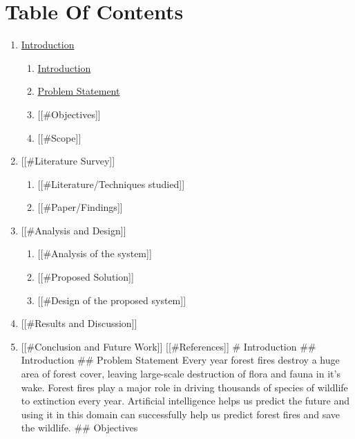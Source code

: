 \hypertarget{table-of-contents}{%
\section{Table Of Contents}\label{table-of-contents}}

\begin{enumerate}
\def\labelenumi{\arabic{enumi}.}
\tightlist
\item
  \protect\hyperlink{introduction}{Introduction}

  \begin{enumerate}
  \def\labelenumii{\arabic{enumii}.}
  \tightlist
  \item
    \protect\hyperlink{ux5cux23introduction}{Introduction}
  \item
    \protect\hyperlink{problem-statement}{Problem Statement}
  \item
    {[}{[}\#Objectives{]}{]}
  \item
    {[}{[}\#Scope{]}{]}
  \end{enumerate}
\item
  {[}{[}\#Literature Survey{]}{]}

  \begin{enumerate}
  \def\labelenumii{\arabic{enumii}.}
  \tightlist
  \item
    {[}{[}\#Literature/Techniques studied{]}{]}
  \item
    {[}{[}\#Paper/Findings{]}{]}
  \end{enumerate}
\item
  {[}{[}\#Analysis and Design{]}{]}

  \begin{enumerate}
  \def\labelenumii{\arabic{enumii}.}
  \tightlist
  \item
    {[}{[}\#Analysis of the system{]}{]}
  \item
    {[}{[}\#Proposed Solution{]}{]}
  \item
    {[}{[}\#Design of the proposed system{]}{]}
  \end{enumerate}
\item
  {[}{[}\#Results and Discussion{]}{]}
\item
  {[}{[}\#Conclusion and Future Work{]}{]} {[}{[}\#References{]}{]} \#
  Introduction \#\# Introduction \#\# Problem Statement Every year
  forest fires destroy a huge area of forest cover, leaving large-scale
  destruction of flora and fauna in it's wake. Forest fires play a major
  role in driving thousands of species of wildlife to extinction every
  year. Artificial intelligence helps us predict the future and using it
  in this domain can successfully help us predict forest fires and save
  the wildlife. \#\# Objectives
\end{enumerate}

